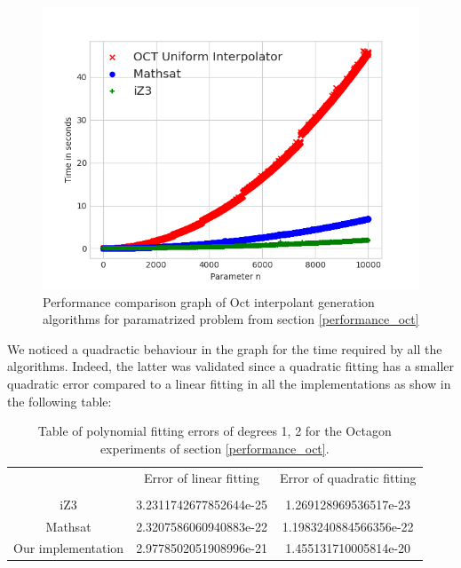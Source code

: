 \begin{figure}
  \centering
  \includegraphics[scale=0.9]{figures/octi_performance_graph}
  \caption{Performance comparison graph of Oct interpolant generation
  algorithms for paramatrized problem from section \ref{performance_oct}} 
  \label{performance_graph_euf}
\end{figure}

We noticed a quadractic behaviour in the graph for the time 
required by all the algorithms. Indeed, the latter was
validated since a quadratic fitting has a smaller quadratic
error compared to a linear fitting in all the implementations
as show in the following table:

\begin{table}[h]
  \centering
  \begin{tabular}{ccc}
    \toprule
    {}                 & Error of linear fitting & Error of quadratic fitting \\
    \cmidrule{2-2} \cmidrule{3-3}                                             \\
    iZ3                & 3.2311742677852644e-25 & 1.269128969536517e-23       \\
    Mathsat            & 2.3207586060940883e-22 & 1.1983240884566356e-22      \\
    Our implementation & 2.9778502051908996e-21 & 1.455131710005814e-20       \\
    \bottomrule
  \end{tabular}
  \caption{Table of polynomial fitting errors of degrees 1, 2 for the
  Octagon experiments of section \ref{performance_oct}.}
\end{table}

